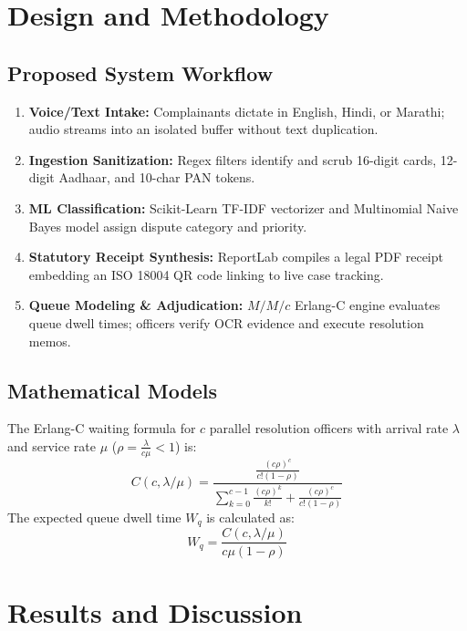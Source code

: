 \documentclass[12pt,singleside,a4paper]{article}
\begin{document}
\section{Design and Methodology}

\subsection{Proposed System Workflow}
\begin{enumerate}
    \item \textbf{Voice/Text Intake:} Complainants dictate in English, Hindi, or Marathi; audio streams into an isolated buffer without text duplication.
    \item \textbf{Ingestion Sanitization:} Regex filters identify and scrub 16-digit cards, 12-digit Aadhaar, and 10-char PAN tokens.
    \item \textbf{ML Classification:} Scikit-Learn TF-IDF vectorizer and Multinomial Naive Bayes model assign dispute category and priority.
    \item \textbf{Statutory Receipt Synthesis:} ReportLab compiles a legal PDF receipt embedding an ISO 18004 QR code linking to live case tracking.
    \item \textbf{Queue Modeling \& Adjudication:} $M/M/c$ Erlang-C engine evaluates queue dwell times; officers verify OCR evidence and execute resolution memos.
\end{enumerate}

\subsection{Mathematical Models}
The Erlang-C waiting formula for $c$ parallel resolution officers with arrival rate $\lambda$ and service rate $\mu$ ($\rho = \frac{\lambda}{c\mu} < 1$) is:
\begin{equation}
C(c, \lambda/\mu) = \frac{\frac{(c\rho)^c}{c!(1-\rho)}}{\sum_{k=0}^{c-1} \frac{(c\rho)^k}{k!} + \frac{(c\rho)^c}{c!(1-\rho)}}
\end{equation}
The expected queue dwell time $W_q$ is calculated as:
\begin{equation}
W_q = \frac{C(c, \lambda/\mu)}{c\mu(1 - \rho)}
\end{equation}

\pagebreak

\section{Results and Discussion}
\end{document}
